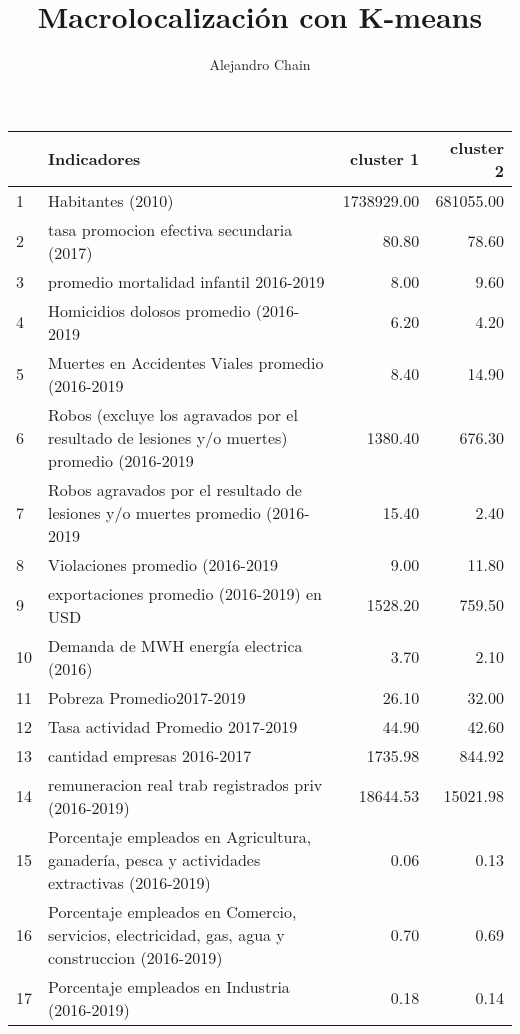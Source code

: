 \documentclass[10pt,a4paper]{book}
\author{Alejandro Chain}
\title{Macrolocalización con K-means}
\begin{document}
\maketitle
\begin{table}[ht]
\centering
\small
\begin{tabular}{llrr}
  \hline
 & Indicadores & cluster 1 & cluster 2 \\ 
  \hline
1 & Habitantes (2010) & 1738929.00 & 681055.00 \\ 
  2 & tasa promocion efectiva secundaria (2017) & 80.80 & 78.60 \\ 
  3 & promedio mortalidad infantil 2016-2019 & 8.00 & 9.60 \\ 
  4 & Homicidios dolosos promedio (2016-2019 & 6.20 & 4.20 \\ 
  5 & Muertes en Accidentes Viales promedio (2016-2019 & 8.40 & 14.90 \\ 
  6 & Robos (excluye los agravados por el resultado de lesiones y/o muertes) promedio (2016-2019 & 1380.40 & 676.30 \\ 
  7 & Robos agravados por el resultado de lesiones y/o muertes  promedio (2016-2019 & 15.40 & 2.40 \\ 
  8 & Violaciones promedio (2016-2019 & 9.00 & 11.80 \\ 
  9 & exportaciones promedio (2016-2019) en USD & 1528.20 & 759.50 \\ 
  10 & Demanda de MWH energía electrica (2016) & 3.70 & 2.10 \\ 
  11 & Pobreza Promedio2017-2019 & 26.10 & 32.00 \\ 
  12 & Tasa actividad Promedio 2017-2019 & 44.90 & 42.60 \\ 
  13 & cantidad empresas 2016-2017 & 1735.98 & 844.92 \\ 
  14 & remuneracion  real trab registrados priv (2016-2019) & 18644.53 & 15021.98 \\ 
  15 & Porcentaje empleados en Agricultura, ganadería, pesca y actividades extractivas (2016-2019) & 0.06 & 0.13 \\ 
  16 & Porcentaje empleados en Comercio, servicios, electricidad, gas, agua y construccion (2016-2019) & 0.70 & 0.69 \\ 
  17 & Porcentaje empleados en Industria (2016-2019) & 0.18 & 0.14 \\ 
   \hline
\end{tabular}
\end{table}
\end{document}
